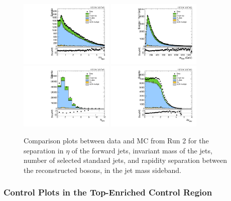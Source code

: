 \begin{figure}[htbp]
  \centering
  \includegraphics[width=0.4\textwidth]{fig/controlPlots/SB_b1_allL_allP_allC_allE_Run2_lnujj_vbfDEta.pdf}
  \includegraphics[width=0.4\textwidth]{fig/controlPlots/SB_b1_allL_allP_allC_allE_Run2_lnujj_vbfMass.pdf}\\
  \includegraphics[width=0.4\textwidth]{fig/controlPlots/SB_b1_allL_allP_allC_allE_Run2_lnujj_nJets.pdf}
  \includegraphics[width=0.4\textwidth]{fig/controlPlots/SB_b1_allL_allP_allC_allE_Run2_dy.pdf}\\
  \caption{
    Comparison plots between data and MC from Run 2 for the separation in $\eta$ of the \VBF forward jets, invariant mass of the \VBF jets, number of selected standard jets, and rapidity separation between the reconstructed bosons, in the jet mass sideband.
  }
  \label{fig:SB_controlPlotsRun2_4}
\end{figure}

\subsubsection{Control Plots in the Top-Enriched Control Region}

